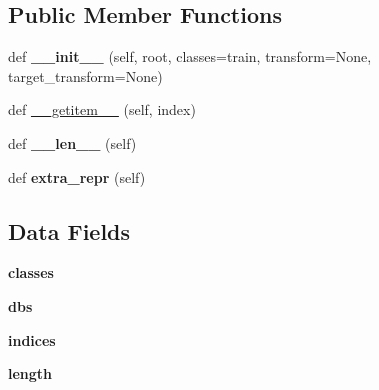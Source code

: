 \subsection*{Public Member Functions}
\begin{DoxyCompactItemize}
\item 
\mbox{\label{classtorchvision_1_1datasets_1_1lsun_1_1LSUN_ad9b6e8023ccb3b50f66118bc76351e8f}} 
def {\bfseries \+\_\+\+\_\+init\+\_\+\+\_\+} (self, root, classes=\textquotesingle{}train\textquotesingle{}, transform=None, target\+\_\+transform=None)
\item 
def \hyperlink{classtorchvision_1_1datasets_1_1lsun_1_1LSUN_ad5ec0ffa137d42ef387cc86809e581ba}{\+\_\+\+\_\+getitem\+\_\+\+\_\+} (self, index)
\item 
\mbox{\label{classtorchvision_1_1datasets_1_1lsun_1_1LSUN_a127a78a93fa848e915584a90f54ead5d}} 
def {\bfseries \+\_\+\+\_\+len\+\_\+\+\_\+} (self)
\item 
\mbox{\label{classtorchvision_1_1datasets_1_1lsun_1_1LSUN_ae7461445ad92fd021ce9e5e7dc99edfc}} 
def {\bfseries extra\+\_\+repr} (self)
\end{DoxyCompactItemize}
\subsection*{Data Fields}
\begin{DoxyCompactItemize}
\item 
\mbox{\label{classtorchvision_1_1datasets_1_1lsun_1_1LSUN_aaa03d0d12984154a4b15f008dbb3be7a}} 
{\bfseries classes}
\item 
\mbox{\label{classtorchvision_1_1datasets_1_1lsun_1_1LSUN_aeaeb104c8e3193d80d1b10f33a5e971e}} 
{\bfseries dbs}
\item 
\mbox{\label{classtorchvision_1_1datasets_1_1lsun_1_1LSUN_aa11c6068d7fe3401e55ad3e0cae11a20}} 
{\bfseries indices}
\item 
\mbox{\label{classtorchvision_1_1datasets_1_1lsun_1_1LSUN_a137e060cec9920da367cfa583821e4b7}} 
{\bfseries length}
\end{DoxyCompactItemize}


